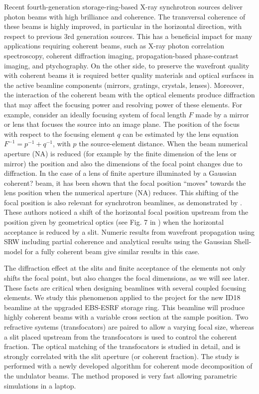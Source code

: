 \documentclass{iucr}              %
\newcommand{\inred}[1]{{\color{red}#1}}
\begin{document}
Recent fourth-generation storage-ring-based X-ray synchrotron sources deliver photon beams with high brilliance and coherence. The transversal coherence of these beams is highly improved, in particular in the horizontal direction, with respect to previous 3rd generation sources. This has a beneficial impact for many applications requiring coherent beams, such as X-ray photon correlation spectroscopy, coherent diffraction imaging, propagation-based phase-contrast imaging, and ptychography. On the other side, to preserve the wavefront quality with coherent beams it is required better quality materials and optical surfaces in the active beamline components (mirrors, gratings, crystals, lenses). Moreover, the interaction of the coherent beam with the optical elements produce diffraction that may affect the focusing power and resolving power of these elements. For example, consider an ideally focusing system of focal length $F$ made by a mirror or lens that focuses the source into an image plane. The position of the focus with respect to the focusing element $q$ can be estimated by the lens equation $F^{-1}=p^{-1}+q^{-1}$, with $p$ the source-element distance. When the beam numerical aperture (NA) is reduced (for example by the finite dimension of the lens or mirror) the position and also the dimensions of the focal point changes due to diffraction. In the case of a lens of finite aperture illuminated by a Gaussian \inred{coherent?} beam, it has been shown \cite{Tanaka:85} that the focal position ``moves" towards the lens position when the numerical aperture (NA) reduces. This shifting of the focal position is also relevant for synchrotron beamlines, as demonstrated by \cite{westfahl}. These authors noticed a shift of the horizontal focal position upstream from the position given by geometrical optics (see Fig. 7 in \cite{westfahl}) when the horizontal acceptance is reduced by a slit. Numeric results from wavefront propagation using SRW \cite{codeSRW} including partial coherence and analytical results using the Gaussian Shell-model for a fully coherent beam give similar results in this case.

The diffraction effect at the slits and finite acceptance of the elements not only shifts the focal point, but also changes the focal dimensions, as we will see later. These facts are critical when designing beamlines with several coupled focusing elements. We study this phenomenon applied to the project for the new ID18 beamline at the upgraded EBS-ESRF storage ring. This beamline will produce highly coherent beams with a variable cross section at the sample position. Two refractive systems (transfocators) are paired to allow a varying focal size, whereas a slit placed upstream from the transfocators is used to control the coherent fraction. The optical matching of the transfocators is studied in detail, and is strongly correlated with the slit aperture (or coherent fraction). The study is performed with a newly developed algorithm for coherent mode decomposition of the undulator beams. The method proposed is very fast allowing parametric simulations in a laptop.
\end{document}
